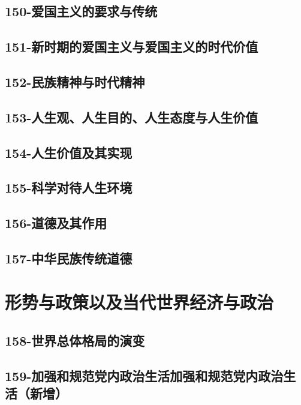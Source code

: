 \subsection{150-爱国主义的要求与传统}

\subsection{151-新时期的爱国主义与爱国主义的时代价值}

\subsection{152-民族精神与时代精神}

\subsection{153-人生观、人生目的、人生态度与人生价值}

\subsection{154-人生价值及其实现}

\subsection{155-科学对待人生环境}

\subsection{156-道德及其作用}

\subsection{157-中华民族传统道德}


\section{形势与政策以及当代世界经济与政治}

\subsection{158-世界总体格局的演变}

\subsection{159-加强和规范党内政治生活加强和规范党内政治生活（新增）}

